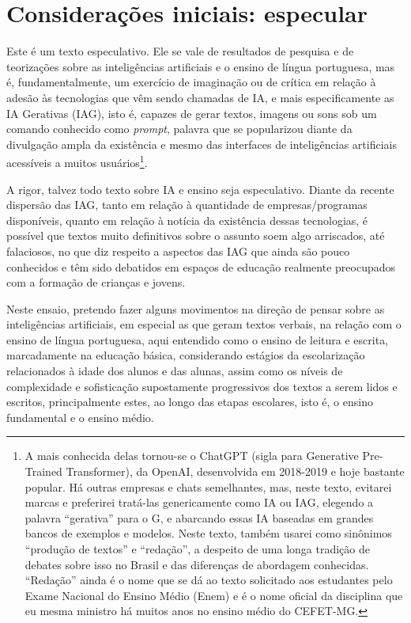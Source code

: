 \documentclass[portuguese]{textolivre}
\begin{document}
\section{Considerações iniciais: especular}\label{sec-intro}
Este é um texto especulativo. Ele se vale de resultados de pesquisa e de teorizações sobre as inteligências artificiais e o ensino de língua portuguesa, mas é, fundamentalmente, um exercício de imaginação ou de crítica em relação à adesão às tecnologias que vêm sendo chamadas de IA, e mais especificamente as IA Gerativas (IAG), isto é, capazes de gerar textos, imagens ou sons sob um comando conhecido como \textit{prompt}, palavra que se popularizou diante da divulgação ampla da existência e mesmo das interfaces de inteligências artificiais acessíveis a muitos usuários\footnote{A mais conhecida delas tornou-se o ChatGPT (sigla para Generative Pre-Trained Transformer), da OpenAI, desenvolvida em 2018-2019 e hoje bastante popular. Há outras empresas e chats semelhantes, mas, neste texto, evitarei marcas e preferirei tratá-las genericamente como IA ou IAG, elegendo a palavra ``gerativa'' para o G, e abarcando essas IA baseadas em grandes bancos de exemplos e modelos. Neste texto, também usarei como sinônimos ``produção de textos'' e ``redação'', a despeito de uma longa tradição de debates sobre isso no Brasil e das diferenças de abordagem conhecidas. ``Redação'' ainda é o nome que se dá ao texto solicitado aos estudantes pelo Exame Nacional do Ensino Médio (Enem) e é o nome oficial da disciplina que eu mesma ministro há muitos anos no ensino médio do CEFET-MG.}.

A rigor, talvez todo texto sobre IA e ensino seja especulativo. Diante da recente dispersão das IAG, tanto em relação à quantidade de empresas/programas disponíveis, quanto em relação à notícia da existência dessas tecnologias, é possível que textos muito definitivos sobre o assunto soem algo arriscados, até falaciosos, no que diz respeito a aspectos das IAG que ainda são pouco conhecidos e têm sido debatidos em espaços de educação realmente preocupados com a formação de crianças e jovens.

Neste ensaio, pretendo fazer alguns movimentos na direção de pensar sobre as inteligências artificiais, em especial as que geram textos verbais, na relação com o ensino de língua portuguesa, aqui entendido como o ensino de leitura e escrita, marcadamente na educação básica, considerando estágios da escolarização relacionados à idade dos alunos e das alunas, assim como os níveis de complexidade e sofisticação supostamente progressivos dos textos a serem lidos e escritos, principalmente estes, ao longo das etapas escolares, isto é, o ensino fundamental e o ensino médio.
\end{document}
